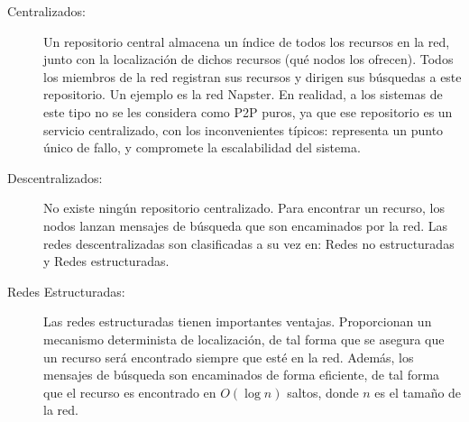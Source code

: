 \begin{description}
\item[Centralizados: ]
Un repositorio central almacena un índice de todos los recursos en la red, junto con la localización de dichos recursos (qué nodos los ofrecen). Todos los miembros de la red registran sus recursos y dirigen sus búsquedas a este repositorio. Un ejemplo es la red Napster. En realidad, a los sistemas de este tipo no se les considera como P2P puros, ya que ese repositorio es un servicio centralizado, con los inconvenientes típicos: representa un punto único de fallo, y compromete la escalabilidad del sistema.

\item[Descentralizados: ]
No existe ningún repositorio centralizado. Para encontrar un recurso, los nodos lanzan mensajes de búsqueda que son encaminados por la red. Las redes descentralizadas son clasificadas a su vez en: Redes no estructuradas y Redes estructuradas.

\item[Redes Estructuradas: ]
Las redes estructuradas tienen importantes ventajas. Proporcionan un mecanismo determinista de localización, de tal forma que se asegura que un recurso será encontrado siempre que esté en la red. Además, los mensajes de búsqueda son encaminados de forma eficiente, de tal forma que el recurso es encontrado en $O(\log n)$ saltos, donde $n$ es el tamaño de la red.

\end{description}